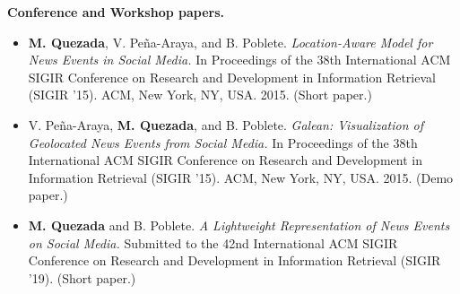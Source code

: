 \begin{intro}
{\bf Conference and Workshop papers.}

\begin{itemize}
    \item {\bf M. Quezada}, V. Peña-Araya, and B. Poblete. {\em Location-Aware
    Model for News Events in Social Media.} In Proceedings of the 38th
    International ACM SIGIR Conference on Research and Development in
    Information Retrieval (SIGIR '15). ACM, New York, NY, USA. 2015.
    (Short paper.)

    \item V. Peña-Araya, {\bf M. Quezada}, and B. Poblete. {\em Galean:
    Visualization of Geolocated News Events from Social Media.} In Proceedings
    of the 38th International ACM SIGIR Conference on Research and Development
    in Information Retrieval (SIGIR '15). ACM, New York, NY, USA. 2015.
    (Demo paper.)

    \item {\bf M. Quezada} and B. Poblete. {\em A Lightweight Representation of
    News Events on Social Media.} Submitted to the 42nd International ACM SIGIR
    Conference on Research and Development in Information Retrieval (SIGIR '19).
    (Short paper.)

\end{itemize}




\end{intro}